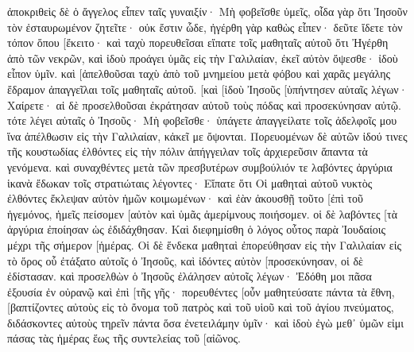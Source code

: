 ἀποκριθεὶς δὲ ὁ ἄγγελος εἶπεν ταῖς γυναιξίν· Μὴ φοβεῖσθε ὑμεῖς, οἶδα γὰρ ὅτι Ἰησοῦν τὸν ἐσταυρωμένον ζητεῖτε· 
οὐκ ἔστιν ὧδε, ἠγέρθη γὰρ καθὼς εἶπεν· δεῦτε ἴδετε τὸν τόπον ὅπου [ἔκειτο· 
καὶ ταχὺ πορευθεῖσαι εἴπατε τοῖς μαθηταῖς αὐτοῦ ὅτι Ἠγέρθη ἀπὸ τῶν νεκρῶν, καὶ ἰδοὺ προάγει ὑμᾶς εἰς τὴν Γαλιλαίαν, ἐκεῖ αὐτὸν ὄψεσθε· ἰδοὺ εἶπον ὑμῖν. 
καὶ [ἀπελθοῦσαι ταχὺ ἀπὸ τοῦ μνημείου μετὰ φόβου καὶ χαρᾶς μεγάλης ἔδραμον ἀπαγγεῖλαι τοῖς μαθηταῖς αὐτοῦ. 
[καὶ [ἰδοὺ Ἰησοῦς [ὑπήντησεν αὐταῖς λέγων· Χαίρετε· αἱ δὲ προσελθοῦσαι ἐκράτησαν αὐτοῦ τοὺς πόδας καὶ προσεκύνησαν αὐτῷ. 
τότε λέγει αὐταῖς ὁ Ἰησοῦς· Μὴ φοβεῖσθε· ὑπάγετε ἀπαγγείλατε τοῖς ἀδελφοῖς μου ἵνα ἀπέλθωσιν εἰς τὴν Γαλιλαίαν, κἀκεῖ με ὄψονται. 
Πορευομένων δὲ αὐτῶν ἰδού τινες τῆς κουστωδίας ἐλθόντες εἰς τὴν πόλιν ἀπήγγειλαν τοῖς ἀρχιερεῦσιν ἅπαντα τὰ γενόμενα. 
καὶ συναχθέντες μετὰ τῶν πρεσβυτέρων συμβούλιόν τε λαβόντες ἀργύρια ἱκανὰ ἔδωκαν τοῖς στρατιώταις 
λέγοντες· Εἴπατε ὅτι Οἱ μαθηταὶ αὐτοῦ νυκτὸς ἐλθόντες ἔκλεψαν αὐτὸν ἡμῶν κοιμωμένων· 
καὶ ἐὰν ἀκουσθῇ τοῦτο [ἐπὶ τοῦ ἡγεμόνος, ἡμεῖς πείσομεν [αὐτὸν καὶ ὑμᾶς ἀμερίμνους ποιήσομεν. 
οἱ δὲ λαβόντες [τὰ ἀργύρια ἐποίησαν ὡς ἐδιδάχθησαν. Καὶ διεφημίσθη ὁ λόγος οὗτος παρὰ Ἰουδαίοις μέχρι τῆς σήμερον [ἡμέρας. 
Οἱ δὲ ἕνδεκα μαθηταὶ ἐπορεύθησαν εἰς τὴν Γαλιλαίαν εἰς τὸ ὄρος οὗ ἐτάξατο αὐτοῖς ὁ Ἰησοῦς, 
καὶ ἰδόντες αὐτὸν [προσεκύνησαν, οἱ δὲ ἐδίστασαν. 
καὶ προσελθὼν ὁ Ἰησοῦς ἐλάλησεν αὐτοῖς λέγων· Ἐδόθη μοι πᾶσα ἐξουσία ἐν οὐρανῷ καὶ ἐπὶ [τῆς γῆς· 
πορευθέντες [οὖν μαθητεύσατε πάντα τὰ ἔθνη, [βαπτίζοντες αὐτοὺς εἰς τὸ ὄνομα τοῦ πατρὸς καὶ τοῦ υἱοῦ καὶ τοῦ ἁγίου πνεύματος, 
διδάσκοντες αὐτοὺς τηρεῖν πάντα ὅσα ἐνετειλάμην ὑμῖν· καὶ ἰδοὺ ἐγὼ μεθ᾽ ὑμῶν εἰμι πάσας τὰς ἡμέρας ἕως τῆς συντελείας τοῦ [αἰῶνος. 
